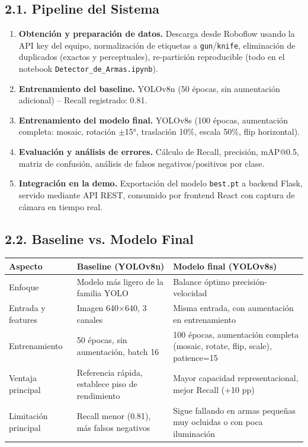 \documentclass[12pt, letterpaper]{article}
\begin{document}
\subsection{2.1. Pipeline del Sistema}

\begin{enumerate}
    \item \textbf{Obtención y preparación de datos.} Descarga desde Roboflow usando la API key del equipo, normalización de etiquetas a \texttt{gun}/\texttt{knife}, eliminación de duplicados (exactos y perceptuales), re-partición reproducible (todo en el notebook \texttt{Detector\_de\_Armas.ipynb}).
    \item \textbf{Entrenamiento del baseline.} YOLOv8n (50 épocas, sin aumentación adicional) -- Recall registrado: 0.81.
    \item \textbf{Entrenamiento del modelo final.} YOLOv8s (100 épocas, aumentación completa: mosaic, rotación $\pm$15°, traslación 10\%, escala 50\%, flip horizontal).
    \item \textbf{Evaluación y análisis de errores.} Cálculo de Recall, precisión, mAP@0.5, matriz de confusión, análisis de falsos negativos/positivos por clase.
    \item \textbf{Integración en la demo.} Exportación del modelo \texttt{best.pt} a backend Flask, servido mediante API REST, consumido por frontend React con captura de cámara en tiempo real.
\end{enumerate}

\subsection{2.2. Baseline vs. Modelo Final}

\begin{center}
\begin{tabular}{L{3cm} L{5cm} L{5cm}}
\toprule
\textbf{Aspecto} & \textbf{Baseline (YOLOv8n)} & \textbf{Modelo final (YOLOv8s)} \\
\midrule
Enfoque & Modelo más ligero de la familia YOLO & Balance óptimo precisión-velocidad \\
Entrada y features & Imagen 640$\times$640, 3 canales & Misma entrada, con aumentación en entrenamiento \\
Entrenamiento & 50 épocas, sin aumentación, batch 16 & 100 épocas, aumentación completa (mosaic, rotate, flip, scale), patience=15 \\
Ventaja principal & Referencia rápida, establece piso de rendimiento & Mayor capacidad representacional, mejor Recall (+10 pp) \\
Limitación principal & Recall menor (0.81), más falsos negativos & Sigue fallando en armas pequeñas muy ocluidas o con poca iluminación \\
\bottomrule
\end{tabular}
\end{center}
\end{document}
